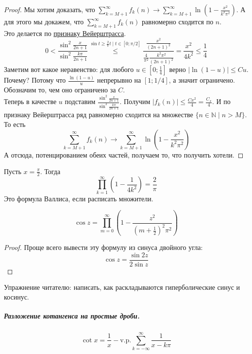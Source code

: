 \documentclass{article}
\begin{document}
\begin{proof}
        Мы хотим доказать, что $\sum\limits_{k=M+1}^\infty f_k(n)\rightarrow\sum\limits_{k=M+1}^\infty\ln\left(1-\frac{x^2}{k^2\pi^2}\right)$. А для этого мы докажем, что $\sum\limits_{k=M+1}^\infty f_k(n)$ равномерно сходится по $n$.\\
        Это делается по \hyperref[Признак Вейерштрасса]{признаку Вейерштрасса}.
        $$
        0<\frac{\sin^2\frac x{2n+1}}{\sin^2\frac{k\pi}{2n+1}}\overset{\sin t\geqslant\frac2\pi t\mid t\in[0;\pi/2]}\leqslant\frac{\frac{x^2}{(2n+1)^2}}{\frac4{\pi^2}\frac{k^2\pi^2}{(2n+1)^2}}=\frac{x^2}{4k^2}\leqslant\frac14
        $$
        Заметим вот какое неравенство: для любого $u\in\left[0;\frac14\right]$ верно $|\ln(1-u)|\leqslant Cu$. Почему? Потому что $\frac{\ln(1-u)}u$ непрерывно на $\left[1;1/4\right]$, а значит ограничено. Обозначим то, чем оно ограничено за $C$.\\
        Теперь в качестве $u$ подставим $\frac{\sin^2\frac x{2n+1}}{\sin^2\frac{k\pi}{2n+1}}$. Получим $|f_k(n)|\leqslant\frac{Cx^2}4=\frac{C_x}4$. И по признаку Вейерштрасса ряд равномерно сходится на множестве $\{n\in\mathbb N\mid n>M\}$. То есть
        $$
        \sum\limits_{k=M+1}^\infty f_k(n)\rightarrow\sum\limits_{k=M+1}^\infty\ln\left(1-\frac{x^2}{k^2\pi^2}\right)
        $$
        А отсюда, потенцированием обеих частей, получаем то, что получить хотели.
    \end{proof}
    \begin{corollary}
        Пусть $x=\frac\pi2$. Тогда
        $$
        \prod\limits_{k=1}^\infty\left(1-\frac1{4k^2}\right)=\frac2\pi
        $$
        Это формула Валлиса, если расписать множители.
    \end{corollary}
    \begin{corollary}
        $$
        \cos z=\prod_{m=0}^\infty\left(1-\frac{z^2}{\left(m+\frac12\right)^2\pi^2}\right)
        $$
    \end{corollary}
    \begin{proof}
        Проще всего вывести эту формулу из синуса двойного угла: $$\cos z=\frac{\sin2z}{2\sin z}$$
    \end{proof}
    \begin{corollary}
        Упражнение читателю: написать, как раскладываются гиперболические синус и косинус.
    \end{corollary}
    \subparagraph{Разложение котангенса на простые дроби.}
    \begin{theorem}
        $$\cot x=\frac1x-\mathrm{v.p.}\sum\limits_{k=-\infty}^\infty\frac1{x-k\pi}$$
    \end{theorem}
\end{document}
